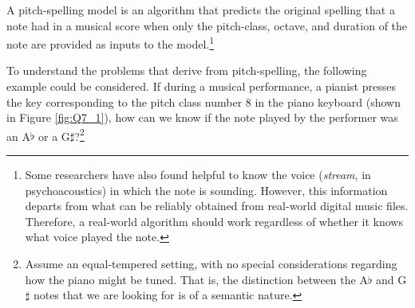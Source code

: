 


A pitch-spelling model is an algorithm that predicts the original spelling that a note had in a musical score when only the pitch-class, octave, and duration of the note are provided as inputs to the model.\footnote{Some researchers have also found helpful to know the voice (\emph{stream}, in psychoacoustics) in which the note is sounding. However, this information departs from what can be reliably obtained from real-world digital music files. Therefore, a real-world algorithm should work regardless of whether it knows what voice played the note.}

To understand the problems that derive from pitch-spelling, the following example could be considered. If during a musical performance, a pianist presses the key corresponding to the pitch class number 8 in the piano keyboard (shown in Figure  \ref{fig:Q7_1}), how can we know if the note played by the performer was an A$\flat$ or a G$\sharp$?\footnote{Assume an equal-tempered setting, with no special considerations regarding how the piano might be tuned. That is, the distinction between the A$\flat$ and G$\sharp$ notes that we are looking for is of a semantic nature.}

